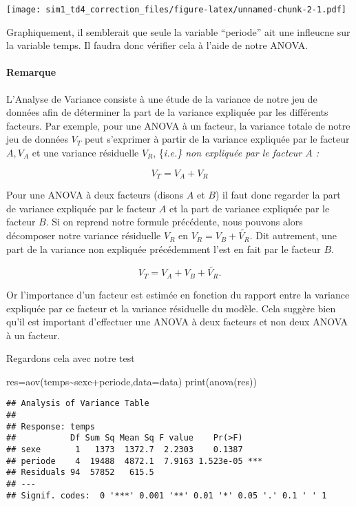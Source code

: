 \documentclass[
]{article}
\newenvironment{Shaded}{\begin{snugshade}}{\end{snugshade}}
\newcommand{\AttributeTok}[1]{\textcolor[rgb]{0.77,0.63,0.00}{#1}}
\newcommand{\FunctionTok}[1]{\textcolor[rgb]{0.00,0.00,0.00}{#1}}
\newcommand{\NormalTok}[1]{#1}
\newcommand{\OtherTok}[1]{\textcolor[rgb]{0.56,0.35,0.01}{#1}}
\newcommand{\SpecialCharTok}[1]{\textcolor[rgb]{0.00,0.00,0.00}{#1}}
\begin{document}
\texttt{[image: sim1\_td4\_correction\_files/figure-latex/unnamed-chunk-2-1.pdf]}

Graphiquement, il semblerait que seule la variable ``periode'' ait une
infleucne sur la variable temps. Il faudra donc vérifier cela à l'aide
de notre ANOVA.\\

\paragraph{Remarque}

L'Analyse de Variance consiste à une étude de la variance de notre jeu
de données afin de déterminer la part de la variance expliquée par les
différents facteurs. Par exemple, pour une ANOVA à un facteur, la
variance totale de notre jeu de données \(V_T\) peut s'exprimer à partir
de la variance expliquée par le facteur \(A, V_A\) et une variance
résiduelle \(V_R\), \{\it i.e.\} non expliquée par le facteur \(A\) :

\[V_T = V_A + V_R\]

Pour une ANOVA à deux facteurs (disons \(A\) et \(B\)) il faut donc
regarder la part de variance expliquée par le facteur \(A\) et la part
de variance expliquée par le facteur \(B\). Si on reprend notre formule
précédente, nous pouvons alors décomposer notre variance résiduelle
\(V_R\) en \(V_R = V_B + \tilde{V_R}\). Dit autrement, une part de la
variance non expliquée précédemment l'est en fait par le facteur \(B\).

\[V_T = V_A + V_B + \tilde{V_R}.\]

Or l'importance d'un facteur est estimée en fonction du rapport entre la
variance expliquée par ce facteur et la variance résiduelle du modèle.
Cela suggère bien qu'il est important d'effectuer une ANOVA à deux
facteurs et non deux ANOVA à un facteur.

Regardons cela avec notre test

\begin{Shaded}
\begin{Highlighting}[]
\NormalTok{res}\OtherTok{=}\FunctionTok{aov}\NormalTok{(temps}\SpecialCharTok{\textasciitilde{}}\NormalTok{sexe}\SpecialCharTok{+}\NormalTok{periode,}\AttributeTok{data=}\NormalTok{data) }
\FunctionTok{print}\NormalTok{(}\FunctionTok{anova}\NormalTok{(res))}
\end{Highlighting}
\end{Shaded}

\begin{verbatim}
## Analysis of Variance Table
## 
## Response: temps
##           Df Sum Sq Mean Sq F value    Pr(>F)    
## sexe       1   1373  1372.7  2.2303    0.1387    
## periode    4  19488  4872.1  7.9163 1.523e-05 ***
## Residuals 94  57852   615.5                      
## ---
## Signif. codes:  0 '***' 0.001 '**' 0.01 '*' 0.05 '.' 0.1 ' ' 1
\end{verbatim}
\end{document}
